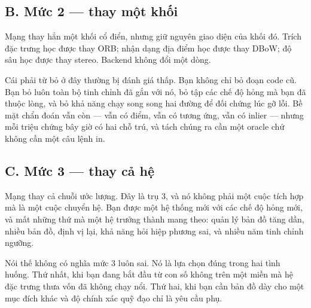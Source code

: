 \documentclass[../../deep_learning.tex]{subfiles}
\begin{document}
\subsection{B. Mức 2 --- thay một khối}
Mạng thay hẳn một khối cổ điển, nhưng giữ nguyên giao diện của khối đó. Trích đặc trưng học được thay ORB; nhận dạng địa điểm học được thay DBoW; độ sâu học được thay stereo. Backend không đổi một dòng.

Cái phải từ bỏ ở đây thường bị đánh giá thấp. Bạn không chỉ bỏ đoạn code cũ. Bạn bỏ luôn toàn bộ tinh chỉnh đã gắn với nó, bỏ tập các chế độ hỏng mà bạn đã thuộc lòng, và bỏ khả năng chạy song song hai đường để đối chứng lúc gỡ lỗi. Bề mặt chẩn đoán vẫn còn --- vẫn có điểm, vẫn có tương ứng, vẫn có inlier --- nhưng mỗi triệu chứng bây giờ có hai chỗ trú, và tách chúng ra cần một oracle chứ không cần một câu lệnh in.

\subsection{C. Mức 3 --- thay cả hệ}
Mạng thay cả chuỗi ước lượng. Đây là trụ 3, và nó không phải một cuộc tích hợp mà là một cuộc chuyển hệ. Bạn được một hệ thống mới với các chế độ hỏng mới, và mất những thứ mà một hệ trưởng thành mang theo: quản lý bản đồ tăng dần, nhiều bản đồ, định vị lại, khả năng hỏi hiệp phương sai, và nhiều năm tinh chỉnh ngưỡng.

Nói thế không có nghĩa mức 3 luôn sai. Nó là lựa chọn đúng trong hai tình huống. Thứ nhất, khi bạn đang bắt đầu từ con số không trên một miền mà hệ đặc trưng thưa vốn đã không chạy nổi. Thứ hai, khi bạn cần bản đồ dày cho một mục đích khác và độ chính xác quỹ đạo chỉ là yêu cầu phụ.
\end{document}
